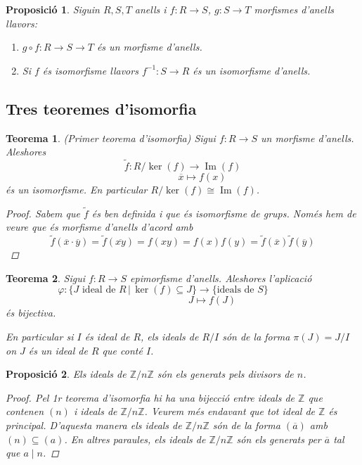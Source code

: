 \documentclass[a4paper,11pt]{report}
\newcommand{\inv}[1]{#1^{-1}}
\newcommand{\barra}{\,|\,}
\renewcommand{\div}{\mid}
\newcommand{\zn}{\mathbb{Z}/n\mathbb{Z}}
\renewcommand{\bar}{\overline}
\theoremstyle{theorem}
\newtheorem{proposicio}{\normalfont \sffamily\bfseries Proposició}[section]
\newtheorem{teorema}{\normalfont \sffamily\bfseries Teorema}[section]
\theoremstyle{definition}
\DeclareMathOperator{\ima}{Im}
\begin{document}
\begin{proposicio}
	Siguin $R,S,T$ anells i $f:R\longrightarrow S$, $g:S\longrightarrow T$ morfismes d'anells llavors:
	\begin{enumerate}
		\item $g\circ f:R\longrightarrow S\longrightarrow T$ és un morfisme d'anells.
		\item Si $f$ és isomorfisme llavors $\inv{f}:S\longrightarrow R$ és un isomorfisme d'anells.
	\end{enumerate}
\end{proposicio}
\subsection{Tres teoremes d'isomorfia}
\begin{teorema}(Primer teorema d'isomorfia)
	Sigui $f:R\longrightarrow S$ un morfisme d'anells. Aleshores 
	$$\tilde{f}:R/\ker(f)\longrightarrow \ima(f)$$
	$$\qquad\qquad \bar{x}\longmapsto f(x)$$
	és un isomorfisme. En particular $R/\ker(f)\cong {\ima(f)}$.
	\begin{proof}
		Sabem que $\tilde{f}$ és ben definida i que és isomorfisme de grups. Només hem de veure que és morfisme d'anells d'acord amb $$\tilde{f}(\bar{x}\cdot\bar{y})=\tilde{f}(\bar{xy})=f(xy)=f(x)f(y)=\tilde{f}(\bar{x})\tilde{f}(\bar{y})$$
	\end{proof}
\end{teorema}
\begin{teorema}
	Sigui $f:R\longrightarrow S$ epimorfisme d'anells. Aleshores l'aplicació
	$$\varphi:\{J \text{ ideal de }R\barra \ker(f)\subseteq J\}\longrightarrow\{\text{ideals de } S\}\qquad\qquad$$
	$$\qquad\qquad\qquad J\longmapsto f(J)$$
	és bijectiva.
	
	En particular si $I$ és ideal de $R$, els ideals de $R/I$ són de la forma $\pi(J)=J/I$ on $J$ és un ideal de $R$ que conté $I$.
\end{teorema}
\begin{proposicio}
	Els ideals de $\zn$ són els generats pels divisors de $n$.
	\begin{proof}
		Pel 1r teorema d'isomorfia hi ha una bijecció entre ideals de $\mathbb{Z}$ que contenen $(n)$ i ideals de $\zn$. Veurem més endavant que tot ideal de $\mathbb{Z}$ és principal. D'aquesta manera els ideals de $\zn$ són de la forma $(\bar{a})$ amb $(n)\subseteq (a)$. En altres paraules, els ideals de $\zn$ són els generats per $\bar{a}$ tal que $a\div n$.
	\end{proof}
\end{proposicio}
\end{document}
